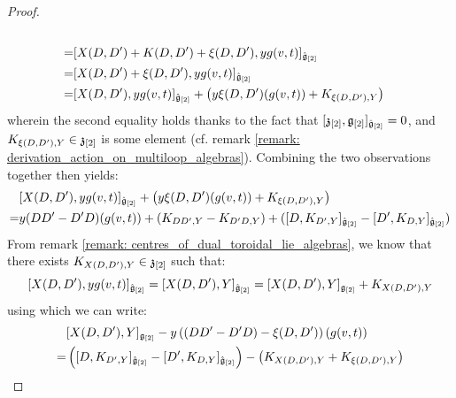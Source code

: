 \begin{proof}
$$\begin{aligned}
                            \\
                            = & [ X(D, D') + K(D, D') + \xi(D, D') , y g(v, t) ]_{\hat{\mathfrak{g}}_{[2]}}
                            \\
                            = & [ X(D, D') + \xi(D, D') , y g(v, t) ]_{\hat{\mathfrak{g}}_{[2]}}
                            \\
                            = & [ X(D, D') , y g(v, t) ]_{\hat{\mathfrak{g}}_{[2]}} + \left( y \xi(D, D')(g(v, t)) + K_{\xi(D, D'), Y} \right)
                        \end{aligned}
                    $$
                wherein the second equality holds thanks to the fact that $[\mathfrak{z}_{[2]}, \mathfrak{g}_{[2]}]_{\hat{\mathfrak{g}}_{[2]}} = 0$, and $K_{\xi(D, D'), Y} \in \mathfrak{z}_{[2]}$ is some element (cf. remark \ref{remark: derivation_action_on_multiloop_algebras}). Combining the two observations together then yields:
                    $$
                        \begin{aligned}
                            & [ X(D, D') , y g(v, t) ]_{\hat{\mathfrak{g}}_{[2]}} + \left( y \xi(D, D')(g(v, t)) + K_{\xi(D, D'), Y} \right)
                            \\
                            = & y (DD' - D'D)( g(v, t) ) + ( K_{DD', Y} - K_{D'D, Y} ) + ( [ D, K_{D', Y} ]_{\hat{\mathfrak{g}}_{[2]}} - [ D', K_{D, Y} ]_{\hat{\mathfrak{g}}_{[2]}} )
                        \end{aligned}
                    $$
                From remark \ref{remark: centres_of_dual_toroidal_lie_algebras}, we know that there exists $K_{X(D, D'), Y} \in \mathfrak{z}_{[2]}$ such that:
                    $$[ X(D, D') , y g(v, t) ]_{\hat{\mathfrak{g}}_{[2]}} = [ X(D, D') , Y ]_{\hat{\mathfrak{g}}_{[2]}} = [X(D, D'), Y]_{\mathfrak{g}_{[2]}} + K_{X(D, D'), Y}$$
                using which we can write:
                    $$
                        \begin{aligned}
                            & [X(D, D'), Y]_{\mathfrak{g}_{[2]}} - y \left( ( DD' - D'D) - \xi(D, D') \right)( g(v, t) )
                            \\
                            = & \left( [ D, K_{D', Y} ]_{\hat{\mathfrak{g}}_{[2]}} - [ D', K_{D, Y} ]_{\hat{\mathfrak{g}}_{[2]}} \right) - \left( K_{X(D, D'), Y} + K_{\xi(D, D'), Y} \right)
                        \end{aligned}
                    $$
                    

\end{proof}
